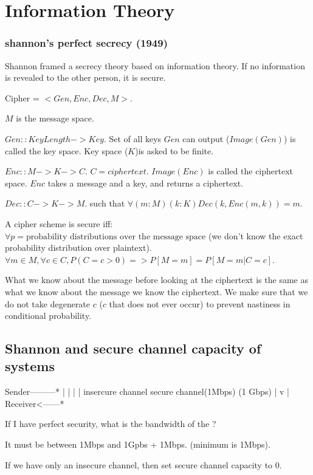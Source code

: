 \chapter{Information Theory}

\subsection{shannon's perfect secrecy (1949)}
Shannon framed a secrecy theory based on information theory. If no
information is revealed to the other person, it is secure.

Cipher = $<Gen, Enc, Dec, M>$.

$M$ is the message space.

$Gen :: KeyLength -> Key$. Set of all keys $Gen$ can output
($Image(Gen)$) is called the key space. Key space ($K$)is asked to be finite.


$Enc :: M -> K -> C$. $C = ciphertext$. $Image(Enc)$ is called the ciphertext space.
$Enc$ takes a message and a key, and returns a ciphertext.

$Dec :: C -> K -> M$. such that $\forall (m: M) (k: K) Dec(k, Enc (m, k)) = m$.

 
A cipher scheme is secure iff: $\forall p = \text{probability distributions over the message space}$
(we don't know the exact probability distribution over
plaintext).
$\forall m \in M, \forall c \in C, P(C = c > 0) => P[M=m] = P[M=m | C=c]$.

What we know about the message before looking at the
ciphertext is the same as what we know about the message  we know the ciphertext.
We make sure that we do not take degenerate $c$ ($c$ that does not ever occur) to prevent nastiness in
conditional probability.

\section{Shannon and secure channel capacity of systems}

        Sender---------*
        |              |
        |              |
 insercure channel secure channel(1Mbps)
     (1 Gbps)          |
        v              |
        Receiver<------*

If I have perfect security, what is the bandwidth of the ?

It must be between 1Mbps and 1Gpbs + 1Mbps. (minimum is 1Mbps).

If we have only an insecure channel, then set secure channel capacity to 0.

